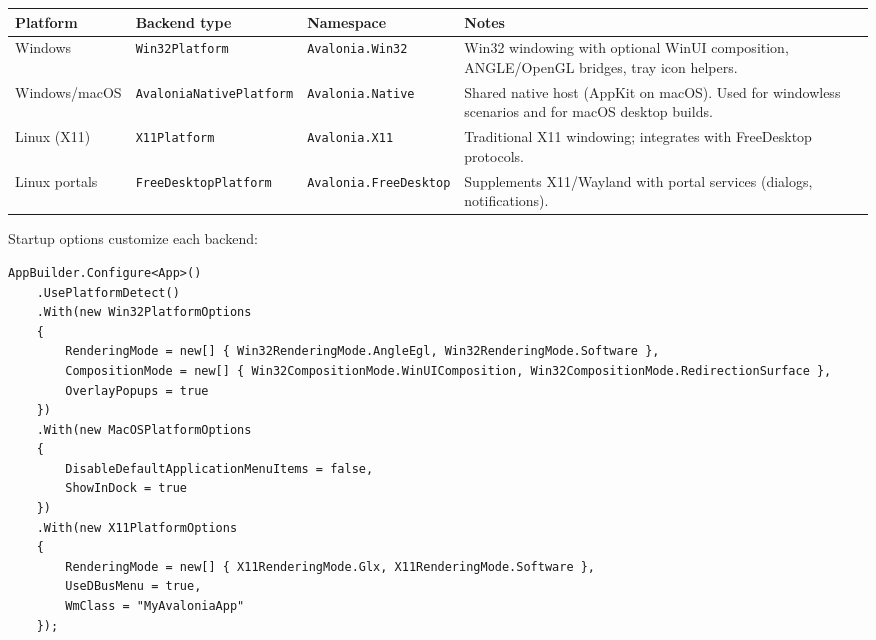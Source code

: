 \begin{longtable}[]{@{}
  >{\raggedright\arraybackslash}p{}
  >{\raggedright\arraybackslash}p{}
  >{\raggedright\arraybackslash}p{}
  >{\raggedright\arraybackslash}p{}@{}}
\toprule\noalign{}
\begin{minipage}[b]{\linewidth}\raggedright
Platform
\end{minipage} & \begin{minipage}[b]{\linewidth}\raggedright
Backend type
\end{minipage} & \begin{minipage}[b]{\linewidth}\raggedright
Namespace
\end{minipage} & \begin{minipage}[b]{\linewidth}\raggedright
Notes
\end{minipage} \\
\midrule\noalign{}
\endhead
\bottomrule\noalign{}
\endlastfoot
Windows & \passthrough{\lstinline!Win32Platform!} &
\passthrough{\lstinline!Avalonia.Win32!} & Win32 windowing with optional
WinUI composition, ANGLE/OpenGL bridges, tray icon helpers. \\
Windows/macOS & \passthrough{\lstinline!AvaloniaNativePlatform!} &
\passthrough{\lstinline!Avalonia.Native!} & Shared native host (AppKit
on macOS). Used for windowless scenarios and for macOS desktop
builds. \\
Linux (X11) & \passthrough{\lstinline!X11Platform!} &
\passthrough{\lstinline!Avalonia.X11!} & Traditional X11 windowing;
integrates with FreeDesktop protocols. \\
Linux portals & \passthrough{\lstinline!FreeDesktopPlatform!} &
\passthrough{\lstinline!Avalonia.FreeDesktop!} & Supplements X11/Wayland
with portal services (dialogs, notifications). \\
\end{longtable}

Startup options customize each backend:

\begin{lstlisting}
AppBuilder.Configure<App>()
    .UsePlatformDetect()
    .With(new Win32PlatformOptions
    {
        RenderingMode = new[] { Win32RenderingMode.AngleEgl, Win32RenderingMode.Software },
        CompositionMode = new[] { Win32CompositionMode.WinUIComposition, Win32CompositionMode.RedirectionSurface },
        OverlayPopups = true
    })
    .With(new MacOSPlatformOptions
    {
        DisableDefaultApplicationMenuItems = false,
        ShowInDock = true
    })
    .With(new X11PlatformOptions
    {
        RenderingMode = new[] { X11RenderingMode.Glx, X11RenderingMode.Software },
        UseDBusMenu = true,
        WmClass = "MyAvaloniaApp"
    });
\end{lstlisting}

